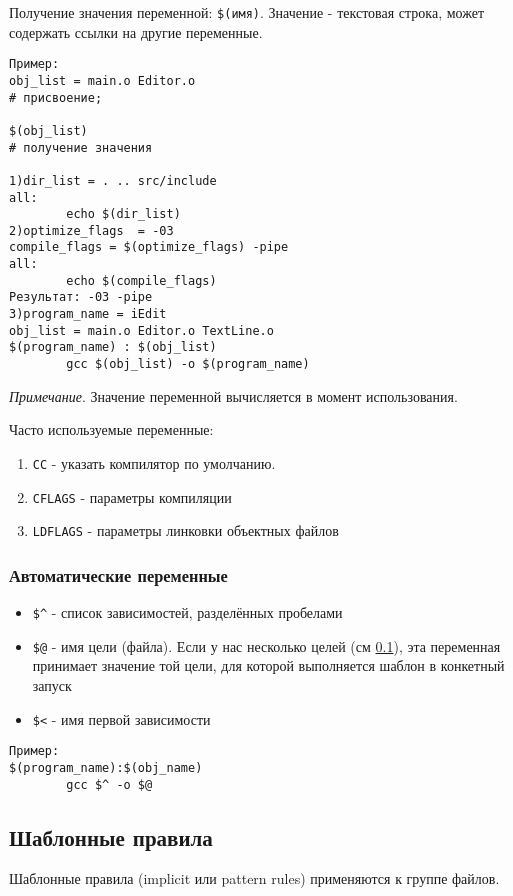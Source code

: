 Получение значения переменной: \verb+$(имя)+. Значение - текстовая строка, может содержать ссылки на другие переменные.
\begin{verbatim}
Пример: 
obj_list = main.o Editor.o 
# присвоение; 

$(obj_list) 
# получение значения

1)dir_list = . .. src/include
all:
        echo $(dir_list) 
2)optimize_flags  = -03
compile_flags = $(optimize_flags) -pipe
all:
        echo $(compile_flags)
Результат: -03 -pipe
3)program_name = iEdit
obj_list = main.o Editor.o TextLine.o
$(program_name) : $(obj_list)
        gcc $(obj_list) -o $(program_name)
\end{verbatim}

\emph{Примечание}. Значение переменной вычисляется в момент использования.

Часто используемые переменные:
\begin{enumerate}
\item \verb+CC+ - указать компилятор по умолчанию.
\item \verb+CFLAGS+ - параметры компиляции
\item \verb+LDFLAGS+ - параметры линковки объектных файлов
\end{enumerate}

\subsubsection{Автоматические переменные}

\emph{}
\begin{itemize}
\item \verb+$^+ - список зависимостей, разделённых пробелами
\item \verb+$@+ - имя цели (файла). Если у нас несколько целей (см \ref{PatternRules}), эта переменная принимает значение той цели, для которой выполняется шаблон в конкетный запуск
\item \verb+$<+ - имя первой зависимости
\end{itemize}
\begin{verbatim}
Пример:
$(program_name):$(obj_name)
        gcc $^ -o $@
\end{verbatim}

\subsection{Шаблонные правила}
\label{PatternRules}
Шаблонные правила (implicit или pattern rules) применяются к группе файлов.

